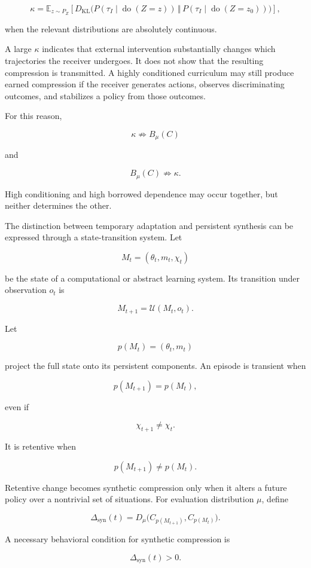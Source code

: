 \documentclass[11pt]{article}
\begin{document}
\[
\kappa
=
\mathbb{E}_{z\sim P_Z}
\left[
D_{\mathrm{KL}}
\bigl(
P(\tau_I\mid \operatorname{do}(Z=z))
\,
\Vert
\,
P(\tau_I\mid \operatorname{do}(Z=z_0))
\bigr)
\right],
\]

when the relevant distributions are absolutely continuous.

A large $\kappa$ indicates that external intervention substantially changes which trajectories the receiver undergoes. It does not show that the resulting compression is transmitted. A highly conditioned curriculum may still produce earned compression if the receiver generates actions, observes discriminating outcomes, and stabilizes a policy from those outcomes.

For this reason,

\[
\kappa
\not\Rightarrow
B_{\mu}(C)
\]

and

\[
B_{\mu}(C)
\not\Rightarrow
\kappa.
\]

High conditioning and high borrowed dependence may occur together, but neither determines the other.

The distinction between temporary adaptation and persistent synthesis can be expressed through a state-transition system. Let

\[
M_t=(\theta_t,m_t,\chi_t)
\]

be the state of a computational or abstract learning system. Its transition under observation $o_t$ is

\[
M_{t+1}
=
\mathcal{U}(M_t,o_t).
\]

Let

\[
p(M_t)=(\theta_t,m_t)
\]

project the full state onto its persistent components. An episode is transient when

\[
p(M_{t+1})=p(M_t),
\]

even if

\[
\chi_{t+1}\neq\chi_t.
\]

It is retentive when

\[
p(M_{t+1})\neq p(M_t).
\]

Retentive change becomes synthetic compression only when it alters a future policy over a nontrivial set of situations. For evaluation distribution $\mu$, define

\[
\Delta_{\mathrm{syn}}(t)
=
D_{\mu}
\bigl(
C_{p(M_{t+1})},
C_{p(M_t)}
\bigr).
\]

A necessary behavioral condition for synthetic compression is

\[
\Delta_{\mathrm{syn}}(t)>0.
\]
\end{document}
